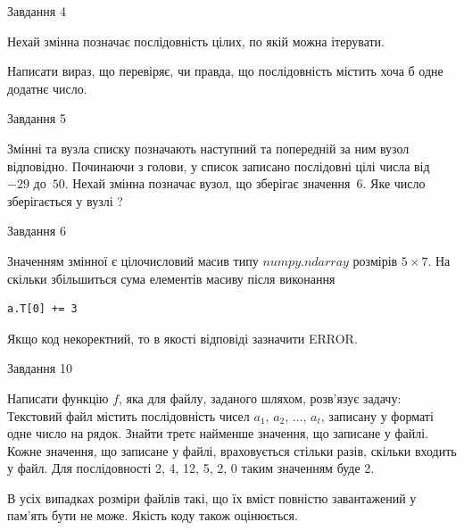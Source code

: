 \documentclass[12pt, ukrainian]{article}
\begin{document}
{               
{\begin{center}Завдання {4}\end{center}}
\vspace{-6mm}
Нехай змінна  позначає послідовність цілих, по якій можна ітерувати.

Написати вираз, що перевіряє, чи правда, що послідовність  містить хоча б одне додатнє число.\par

\vspace{10mm}
               
{\begin{center}Завдання {5}\end{center}}
\vspace{-6mm}
Змінні  та  вузла списку позначають наступний та попередній за ним вузол відповідно. Починаючи з голови, у список записано послідовні цілі числа від~$-29$ до~$50$. Нехай змінна  позначає вузол, що зберігає значення~$6$.
Яке число зберігається у вузлі  ?\par

               
{\begin{center}Завдання {6}\end{center}}
\vspace{-6mm}
Значенням змінної  є цілочисловий масив типу $numpy.ndarray$ розмірів $5{\times}7$. На скільки збільшиться сума елементів масиву  після виконання
\begin{verbatim}
a.T[0] += 3
\end{verbatim}


Якщо код некоректний, то в якості відповіді зазначити ERROR.\par

               
{\begin{center}Завдання {10}\end{center}}
\vspace{-6mm}

Написати функцію $f$, яка для файлу, заданого шляхом, розв’язує задачу:\\ Текстовий файл містить послідовність чисел $a_1$, $a_2$, $\ldots$, $a_t$, записану у форматі одне число на рядок. Знайти третє найменше значення, що записане у файлі. Кожне значення, що записане у файлі, враховується стільки разів, скільки входить у файл. Для послідовності 2, 4, 12, 5, 2, 0 таким значенням буде 2.

В усіх випадках розміри файлів такі, що їх вміст повністю завантажений у пам'ять бути не може. Якість коду також оцінюється.



}
\end{document}
